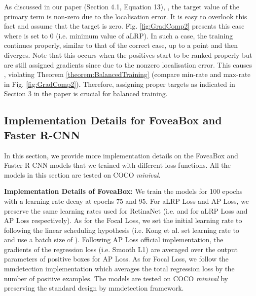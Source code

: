 \documentclass{article}
\begin{document}
As discussed in our paper (Section 4.1, Equation 13), , the target value of the primary term  is non-zero due to the localisation error. It is easy to overlook this fact and assume that the target is zero. Fig. \ref{fig:GradComp2} presents this case where  is set to 0 (i.e. minimum value of aLRP). In such a case, the training continues properly, similar to that of the correct case, up to a point and then diverges. Note that this occurs when the positives start to be ranked properly but are still assigned gradients since  due to the nonzero localisation error. This causes , violating Theorem \ref{theorem:BalancedTraining} (compare min-rate and max-rate in Fig. \ref{fig:GradComp2}). Therefore, assigning proper targets as indicated in Section 3 in the paper is crucial for balanced training. 

\subsection{Implementation Details for FoveaBox and Faster R-CNN}
In this section, we provide more implementation details on the FoveaBox and Faster R-CNN models that we trained with different loss functions. All the models in this section are tested on COCO \textit{minival}.

\textbf{Implementation Details of FoveaBox:} We train the models for 100 epochs with a learning rate decay at epochs 75 and 95. For aLRP Loss and AP Loss, we preserve the same learning rates used for RetinaNet (i.e.  and  for aLRP Loss and AP Loss respectively). As for the Focal Loss, we set the initial learning rate to  following the linear scheduling hypothesis \cite{MegDet} (i.e. Kong et al. set learning rate to  and use a batch size of ). Following AP Loss official implementation, the gradients of the regression loss (i.e. Smooth L1) are averaged over the output parameters of positive boxes for AP Loss. As for Focal Loss, we follow the mmdetection implementation which averages the total regression loss by the number of positive examples. The models are tested on COCO \textit{minival} by preserving the standard design by mmdetection framework.
\end{document}
